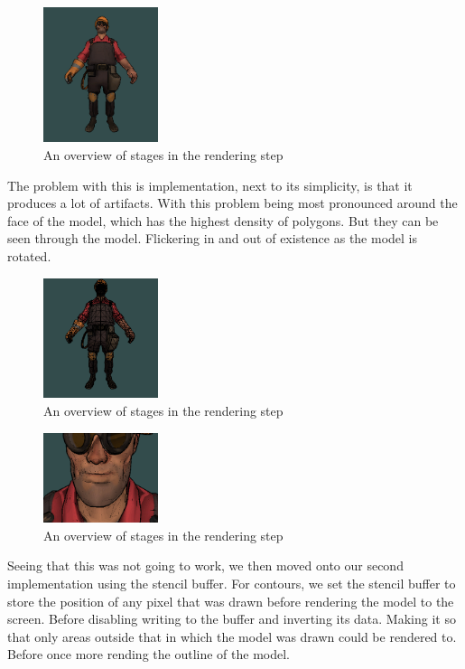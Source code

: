 \begin{figure}[h]
    \centering
    \includegraphics[width=0.3\textwidth]{img/ModelB.png}
    \caption{An overview of stages in the rendering step}
    \label{fig-render-overview}
\end{figure}

The problem with this is implementation, next to its simplicity, is that it produces a lot of artifacts. With this problem being most pronounced around the face of the model, which has the highest density of polygons. But they can be seen through the model. Flickering in and out of existence as the model is rotated.

\begin{figure}[h]
    \centering
    \includegraphics[width=0.3\textwidth]{img/ModelA.png}
    \caption{An overview of stages in the rendering step}
    \label{fig-render-overview}
\end{figure}

\begin{figure}[h]
    \centering
    \includegraphics[width=0.3\textwidth]{img/ModelC.png}
    \caption{An overview of stages in the rendering step}
    \label{fig-render-overview}
\end{figure}

Seeing that this was not going to work, we then moved onto our second implementation using the stencil buffer. For contours, we set the stencil buffer to store the position of any pixel that was drawn before rendering the model to the screen. Before disabling writing to the buffer and inverting its data. Making it so that only areas outside that in which the model was drawn could be rendered to. Before once more rending the outline of the model.

